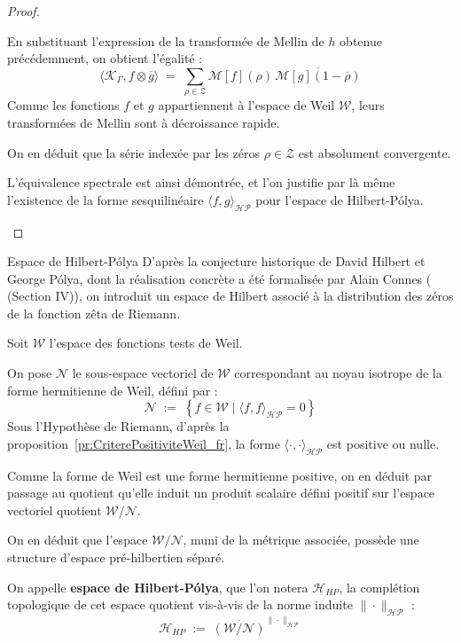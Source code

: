 \documentclass[Riemann_Hypothesis.tex]{subfiles}
\begin{document}
\begin{proof}
\begin{part_proof}
        En substituant l'expression de la transformée de Mellin de $h$ obtenue précédemment, on obtient l'égalité :
        \begin{equation*}
            \langle \mathcal{K}_{\Gamma}, f \otimes \overline{g} \rangle \;=\; \sum_{\rho \in \mathcal{Z}} \mathcal{M}[f](\rho) \, \overline{\mathcal{M}[g](1 - \overline{\rho})}
        \end{equation*}
        Comme les fonctions $f$ et $g$ appartiennent à l'espace de Weil $\mathcal{W}$, leurs transformées de Mellin sont à décroissance rapide. \par
        On en déduit que la série indexée par les zéros $\rho \in \mathcal{Z}$ est absolument convergente. \par
        L'équivalence spectrale est ainsi démontrée, et l'on justifie par là même l'existence de la forme sesquilinéaire $\langle f, g \rangle_{\mathcal{HP}}$ pour l'espace de Hilbert-Pólya.
    \end{part_proof}
\end{proof}

\begin{DefNef}[label=df:EspaceHilbertPolya_fr]{Espace de Hilbert-Pólya}
    D'après la conjecture historique de David Hilbert et George Pólya, 
    dont la réalisation concrète a été formalisée par 
    Alain Connes (\cite{connes1999_trace} (Section IV)), on introduit un espace de Hilbert associé à la distribution des zéros de la fonction zêta de Riemann. \par
    Soit $\mathcal{W}$ l'espace des fonctions tests de Weil. \par
    On pose $\mathcal{N}$ le sous-espace vectoriel de $\mathcal{W}$ correspondant au noyau isotrope de la forme hermitienne de Weil, défini par :
    \begin{equation*}
        \mathcal{N} \;:=\; \left\{ f \in \mathcal{W} \mid \langle f, f \rangle_{\mathcal{HP}} = 0 \right\}
    \end{equation*}
    Sous l'Hypothèse de Riemann, d'après la {proposition}~\ref{pr:CriterePositiviteWeil_fr}, la forme $\langle \cdot, \cdot \rangle_{\mathcal{HP}}$ est positive ou nulle. \par
    Comme la forme de Weil est une forme hermitienne positive, on en déduit par passage au quotient qu'elle induit un produit scalaire défini positif sur l'espace vectoriel quotient $\mathcal{W} / \mathcal{N}$. \par
    On en déduit que l'espace $\mathcal{W} / \mathcal{N}$, muni de la métrique associée, possède une structure d'espace pré-hilbertien séparé. \par
    On appelle \textbf{espace de Hilbert-Pólya}, que l'on notera $\mathcal{H}_{HP}$, la complétion topologique de cet espace quotient vis-à-vis de la norme induite $\|\cdot\|_{\mathcal{HP}}$ :
    \begin{equation*}
        \mathcal{H}_{HP} \;:=\; \overline{\left( \mathcal{W} / \mathcal{N} \right)}^{\|\cdot\|_{\mathcal{HP}}}
    \end{equation*}
\end{DefNef}
\end{document}
